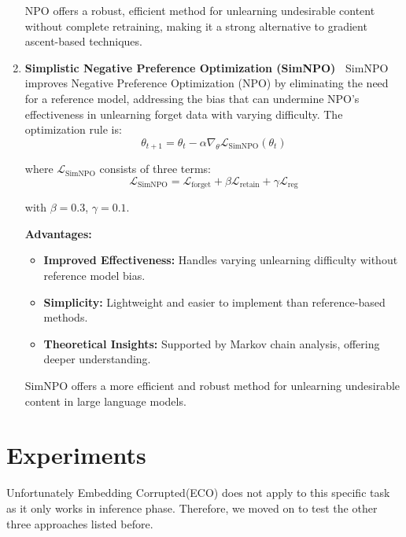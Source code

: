 \documentclass[11pt]{article}
\begin{document}
\begin{enumerate}
        NPO offers a robust, efficient method for unlearning undesirable content without complete retraining, making it a strong alternative to gradient ascent-based techniques.


        \item \textbf{Simplistic Negative Preference Optimization (SimNPO)~\cite{fan2024simplicity} }
        SimNPO improves Negative Preference Optimization (NPO) by eliminating the need for a reference model, addressing the bias that can undermine NPO’s effectiveness in unlearning forget data with varying difficulty. The optimization rule is:
        \vspace{-3pt}
        \[
            \theta_{t+1} = \theta_t - \alpha \nabla_{\theta} \mathcal{L}_{\text{SimNPO}}(\theta_t)
        \]

        where $\mathcal{L}_{\text{SimNPO}}$ consists of three terms:
        \vspace{-3pt}
        \[
            \mathcal{L}_{\text{SimNPO}} = \mathcal{L}_{\text{forget}} + \beta \mathcal{L}_{\text{retain}} + \gamma \mathcal{L}_{\text{reg}}
        \]

        with $\beta = 0.3$, $\gamma = 0.1$.

        \textbf{Advantages:}
        \begin{itemize}
            \item \textbf{Improved Effectiveness:} Handles varying unlearning difficulty without reference model bias.
            \item \textbf{Simplicity:} Lightweight and easier to implement than reference-based methods.
            \item \textbf{Theoretical Insights:} Supported by Markov chain analysis, offering deeper understanding.
        \end{itemize}

        SimNPO offers a more efficient and robust method for unlearning undesirable content in large language models.


    \end{enumerate}


    \section{Experiments}
    Unfortunately Embedding Corrupted(ECO) does not apply to this specific task as it only works in inference phase. Therefore, we moved on to test the other three approaches listed before.
\end{document}
